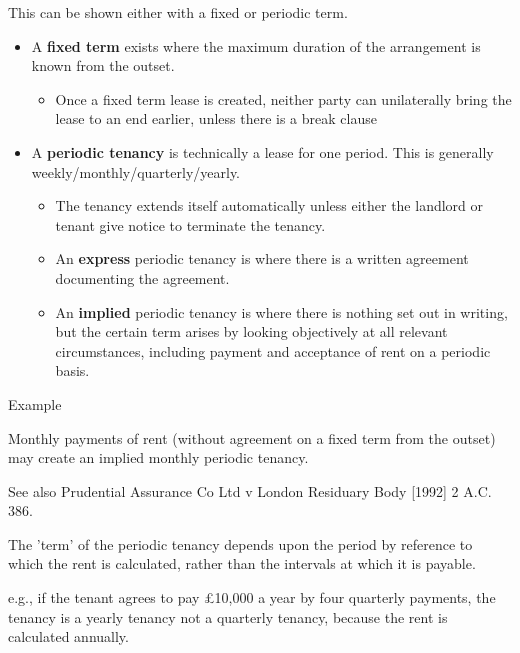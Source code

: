 \documentclass[
]{article}
\providecommand{\tightlist}{%
  \setlength{\itemsep}{0pt}\setlength{\parskip}{0pt}}
\newenvironment{env-8fa37bb4-768d-4893-9e93-b3dc64db7fb6}
{
    \savenotes\tcolorbox[blanker,breakable,left=5pt,borderline west={2pt}{-4pt}{purple}]
}
{
    \endtcolorbox\spewnotes
}
\begin{document}
This can be shown either with a fixed or periodic term.

\begin{itemize}
\tightlist
\item
  A \textbf{fixed term} exists where the maximum duration of the
  arrangement is known from the outset.

  \begin{itemize}
  \tightlist
  \item
    Once a fixed term lease is created, neither party can unilaterally
    bring the lease to an end earlier, unless there is a break clause
  \end{itemize}
\item
  A \textbf{periodic tenancy} is technically a lease for one period.
  This is generally weekly/monthly/quarterly/yearly.

  \begin{itemize}
  \tightlist
  \item
    The tenancy extends itself automatically unless either the landlord
    or tenant give notice to terminate the tenancy.
  \item
    An \textbf{express} periodic tenancy is where there is a written
    agreement documenting the agreement.
  \item
    An \textbf{implied} periodic tenancy is where there is nothing set
    out in writing, but the certain term arises by looking objectively
    at all relevant circumstances, including payment and acceptance of
    rent on a periodic basis.
  \end{itemize}
\end{itemize}

\begin{env-8fa37bb4-768d-4893-9e93-b3dc64db7fb6}

Example

Monthly payments of rent (without agreement on a fixed term from the
outset) may create an implied monthly periodic tenancy.

\end{env-8fa37bb4-768d-4893-9e93-b3dc64db7fb6}

See also Prudential Assurance Co Ltd v London Residuary Body {[}1992{]}
2 A.C. 386.

The 'term' of the periodic tenancy depends upon the period by reference
to which the rent is calculated, rather than the intervals at which it
is payable.

e.g., if the tenant agrees to pay £10,000 a year by four quarterly
payments, the tenancy is a yearly tenancy not a quarterly tenancy,
because the rent is calculated annually.
\end{document}
